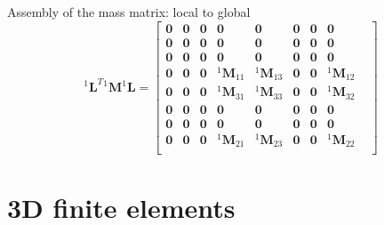 \documentclass[aspectratio=169]{beamer}
\begin{document}
{  \begin{frame}{Assembly of the mass matrix: local to global}
      $$    {}^1\mathbf L^T {}^1\mathbf M{}^1\mathbf L=\begin{bmatrix}
              \mathbf 0 & \mathbf 0 & \mathbf 0 & \mathbf 0          & \mathbf 0          & \mathbf 0 & \mathbf 0 & \mathbf 0          & \\
              \mathbf 0 & \mathbf 0 & \mathbf 0 & \mathbf 0          & \mathbf 0          & \mathbf 0 & \mathbf 0 & \mathbf 0          & \\
              \mathbf 0 & \mathbf 0 & \mathbf 0 & \mathbf 0          & \mathbf 0          & \mathbf 0 & \mathbf 0 & \mathbf 0          & \\
              \mathbf 0 & \mathbf 0 & \mathbf 0 & {}^1\mathbf M_{11} & {}^1\mathbf M_{13} & \mathbf 0 & \mathbf 0 & {}^1\mathbf M_{12} & \\
              \mathbf 0 & \mathbf 0 & \mathbf 0 & {}^1\mathbf M_{31} & {}^1\mathbf M_{33} & \mathbf 0 & \mathbf 0 & {}^1\mathbf M_{32} & \\
              \mathbf 0 & \mathbf 0 & \mathbf 0 & \mathbf 0          & \mathbf 0          & \mathbf 0 & \mathbf 0 & \mathbf 0          & \\
              \mathbf 0 & \mathbf 0 & \mathbf 0 & \mathbf 0          & \mathbf 0          & \mathbf 0 & \mathbf 0 & \mathbf 0          & \\
              \mathbf 0 & \mathbf 0 & \mathbf 0 & {}^1\mathbf M_{21} & {}^1\mathbf M_{23} & \mathbf 0 & \mathbf 0 & {}^1\mathbf M_{22} & \\
          \end{bmatrix}$$
  \end{frame}
 }


\section{3D finite elements}
\end{document}
